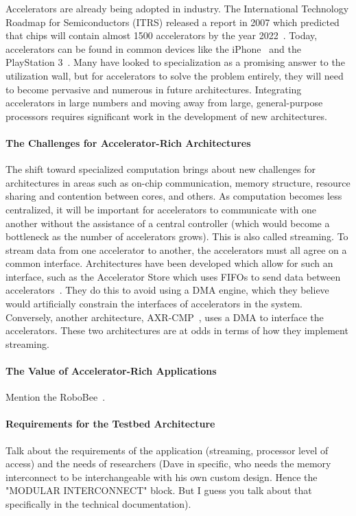 Accelerators are already being adopted in industry. The International Technology Roadmap for Semiconductors (ITRS) released a report in 2007 which predicted that chips will contain almost 1500 accelerators by the year 2022~\cite{itrs:2007}. Today, accelerators can be found in common devices like the iPhone~\cite{Shao:2015} and the PlayStation 3~\cite{Kistler:2006}. Many have looked to specialization as a promising answer to the utilization wall, but for accelerators to solve the problem entirely, they will need to become pervasive and numerous in future architectures. Integrating accelerators in large numbers and moving away from large, general-purpose processors requires significant work in the development of new architectures.

\paragraph{The Challenges for Accelerator-Rich Architectures}
The shift toward specialized computation brings about new challenges for architectures in areas such as on-chip communication, memory structure, resource sharing and contention between cores, and others. As computation becomes less centralized, it will be important for accelerators to communicate with one another without the assistance of a central controller (which would become a bottleneck as the number of accelerators grows). This is also called streaming. To stream data from one accelerator to another, the accelerators must all agree on a common interface. Architectures have been developed which allow for such an interface, such as the Accelerator Store which uses FIFOs to send data between accelerators~\cite{Lyons:2010}. They do this to avoid using a DMA engine, which they believe would artificially constrain the interfaces of accelerators in the system. Conversely, another architecture, AXR-CMP~\cite{Cong:2012}, uses a DMA to interface the accelerators. These two architectures are at odds in terms of how they implement streaming.

\paragraph{The Value of Accelerator-Rich Applications}
Mention the RoboBee~\cite{robobee}.


\paragraph{Requirements for the Testbed Architecture}
Talk about the requirements of the application (streaming, processor level of access) and the needs of researchers (Dave in specific, who needs the memory interconnect to be interchangeable with his own custom design. Hence the "MODULAR INTERCONNECT" block. But I guess you talk about that specifically in the technical documentation).

